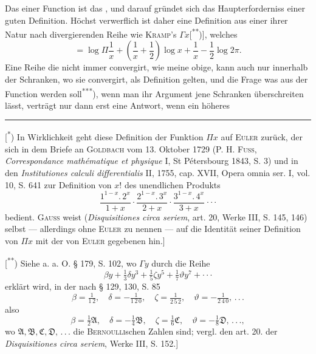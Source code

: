 \indent Das  einer Function ist das , und darauf gründet sich das Haupterforderniss einer guten Definition. Höchst verwerflich ist daher eine Definition aus einer ihrer Natur nach divergierenden Reihe wie \textsc{Kramp}’s $\Gamma x$[\textsuperscript{**})], welches
\[
=\log\Pi\frac{1}{x}+\left(\frac{1}{x}+\frac{1}{2}\right)\log x+\frac{1}{x}-\frac{1}{2}\log2\pi.
\]
\noindent Eine Reihe die nicht immer convergirt, wie meine obige, kann auch nur innerhalb der Schranken, wo sie convergirt, als Definition gelten, und die Frage was aus der Function werden soll\textsuperscript{***}), wenn man ihr Argument jene Schranken überschreiten lässt, verträgt nur dann erst eine Antwort, wenn ein höheres
\par\medskip\noindent\rule{.24\linewidth}{.4pt}\par\smallskip
{\small
\noindent\hspace*{\parindent}[\textsuperscript{*}) In Wirklichkeit geht diese Definition der Funktion $\Pi x$ auf \textsc{Euler} zurück, der sich in dem Briefe an \textsc{Goldbach} vom 13. Oktober 1729 (P. H. \textsc{Fuss}, \textit{Correspondance mathématique et physique} I, St Pétersbourg 1843, S. 3) und in den \textit{Institutiones calculi differentialis} II, 1755, cap. XVII, Opera omnia ser. I, vol. 10, S. 641 zur Definition von $x!$ des unendlichen Produkts
\[
\frac{1^{1-x}{.}\,2^x}{1+x}\cdot\frac{2^{1-x}{.}\,3^x}{2+x}\cdot\frac{3^{1-x}{.}\,4^x}{3+x}\ \mathord{\cdot}\,\mathord{\cdot}\,\mathord{\cdot}
\]
\noindent bedient. \textsc{Gauss} weist (\textit{Disquisitiones circa seriem}, art. 20, Werke III, S. 145, 146) selbst — allerdings ohne \textsc{Euler} zu nennen — auf die Identität seiner Definition von $\Pi x$ mit der von \textsc{Euler} gegebenen hin.]
\par\noindent\hspace*{\parindent}[\textsuperscript{**}) Siehe a. a. O. § 179, S. 102, wo $\Gamma y$ durch die Reihe
\[
\beta y+\tfrac{1}{3}\delta y^3+\tfrac{1}{5}\zeta y^5+\tfrac{1}{7}\vartheta y^7+\mathord{\cdot}\,\mathord{\cdot}\,\mathord{\cdot}
\]
\noindent erklärt wird, in der nach § 129, 130, S. 85
\[
\beta=\tfrac{1}{1\,2},\quad\delta=-\tfrac{1}{1\,2\,0},\quad\zeta=\tfrac{1}{2\,5\,2},\quad\vartheta=-\tfrac{1}{2\,4\,0},\,{.}\,{.}\,{.}
\]
\noindent also
\[
\beta=\tfrac{1}{2}\mathfrak A,\quad\delta=-\tfrac{1}{4}\mathfrak B,\quad\zeta=\tfrac{1}{6}\mathfrak C,\quad\vartheta=-\tfrac{1}{8}\mathfrak D,\,{.}\,{.}\,{.},
\]
\noindent wo $\mathfrak A,\mathfrak B,\mathfrak C,\mathfrak D,\,{.}\,{.}\,{.}$ die \textsc{Bernoulli}schen Zahlen sind; vergl. den art. 20. der \textit{Disquisitiones circa seriem}, Werke III, S. 152.]
\par}
